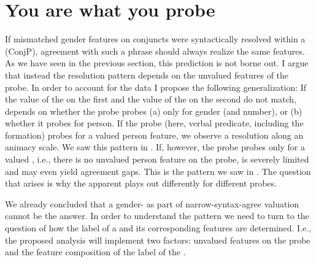 \documentclass[output=paper,modfontsnewtxmath,hidelinks]{langscibook}
\begin{document}
\section{You are what you probe}

If mismatched gender features on conjuncts were syntactically resolved within a  (ConjP), agreement with such a phrase should always realize the same features. As we have seen in the previous section, this prediction is not borne out. I argue that instead the resolution pattern depends on the unvalued features of the probe. In order to account for the data I propose the following generalization: If the value of the  on the first  and the value of the  on the second  do not match,  depends on whether the probe probes (a) only for gender (and number), or (b) whether it probes for person. If the probe (here, verbal predicate, including the  formation) probes for a valued person feature, we observe a resolution along an animacy scale. We saw this pattern in . If, however, the probe probes only for a valued , i.e., there is no unvalued person feature on the probe,  is severely limited and may even yield agreement gaps. This is the pattern we saw in . The question that arises is why the apparent  plays out differently for different probes.

We already concluded that a gender- as part of narrow-syn\-tax-agree valuation cannot be the answer. In order to understand the pattern we need to turn to the question of how the label of a  and its corresponding features are determined. I.e., the proposed analysis will implement two factors: unvalued features on the probe and the feature composition of the label of the . 
\end{document}
